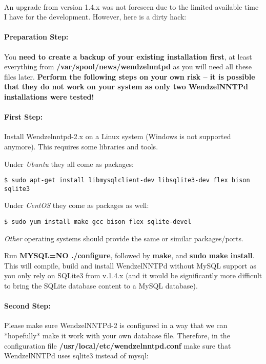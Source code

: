~

An upgrade from version 1.4.x was not foreseen due to the limited available time I have for the development. However, here is a dirty hack:

\paragraph*{Preparation Step:} You \textbf{need to create a backup of your existing installation first}, at least everything from \textbf{/var/spool/news/wendzelnntpd} as you will need all these files later. \textbf{Perform the following steps on your own risk -- it is possible that they do not work on your system as only two WendzelNNTPd installations were tested!}

\paragraph*{First Step:} Install Wendzelnntpd-2.x on a Linux system (Windows is not supported anymore). This requires some libraries and tools.

Under \textit{Ubuntu} they all come as packages:
\begin{verbatim}
$ sudo apt-get install libmysqlclient-dev libsqlite3-dev flex bison sqlite3
\end{verbatim}

Under \textit{CentOS} they come as packages as well:
\begin{verbatim}
$ sudo yum install make gcc bison flex sqlite-devel
\end{verbatim}

\textit{Other} operating systems should provide the same or similar packages/ports.

Run \textbf{MYSQL=NO ./configure}, followed by \textbf{make}, and \textbf{sudo make install}. This will compile, build and install WendzelNNTPd without MySQL support as you only rely on SQLite3 from v.1.4.x (and it would be significantly more difficult to bring the SQLite database content to a MySQL database).

\paragraph*{Second Step:} Please make sure WendzelNNTPd-2 is configured in a way that we can *hopefully* make it work with your own database file. Therefore, in the configuration file \textbf{/usr/local/etc/wendzelnntpd.conf} make sure that WendzelNNTPd uses sqlite3 instead of mysql:

